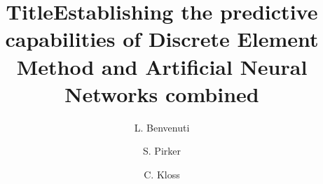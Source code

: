 \documentclass[final,3p,times,twocolumn]{elsarticle}
\begin{document}
\begin{frontmatter}


\title{Title}

\title{Establishing the predictive capabilities of Discrete Element Method and Artificial Neural Networks combined}


\author[JKU PFM]{L. Benvenuti }

\author[JKU PFM]{S. Pirker}

\address[JKU PFM]{JKU Department of Particulate Flow Modelling - Linz}




\author[DCS]{C. Kloss}
\address[DCS]{DCS Computing - Linz}



\end{frontmatter}
\end{document}
